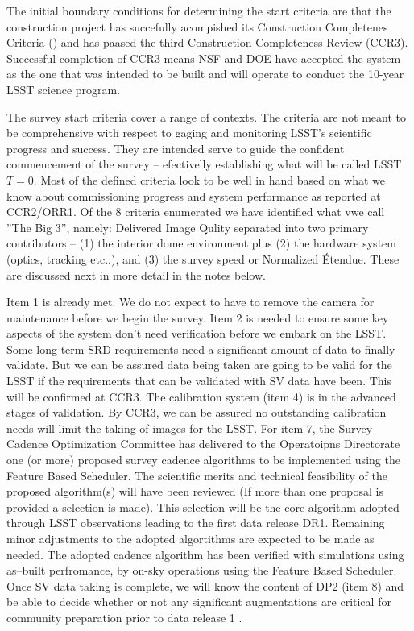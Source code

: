 The initial boundary conditions for determining the start criteria are that the construction project has succefully acompished its Construction Completenes Criteria (\cite{SITCOMTN-005}) and has paased the third Construction Completeness Review (CCR3).  Successful completion of CCR3 means NSF and DOE have accepted the system as the one that was intended to be built and will operate to conduct the 10-year LSST science program.  

The survey start criteria cover a range of contexts.  The criteria are not meant to be comprehensive with respect to gaging and monitoring LSST's scientific progress and success. They are intended serve to guide the confident commencement of the survey -- efectivelly establishing what will be called LSST $T=0$.  Most of the defined criteria look to be well in hand based on what we know about commissioning progress and system performance as reported at CCR2/ORR1.  Of the 8 criteria enumerated we have identified what vwe call ''The Big 3'', namely: Delivered Image Qulity separated into two primary contributors -- (1) the interior dome environment plus (2) the hardware system (optics, tracking etc..), and (3) the survey speed or Normalized \'{E}tendue. These are discussed next in more detail in the notes below.

Item 1 is already met. We do not expect to have to remove the camera for maintenance before we begin the survey. Item 2 is needed to ensure some key aspects of the system don't need verification before we embark on the LSST. Some long term SRD requirements need a significant amount of data to finally validate. But we can be assured data being taken are going to be valid for the LSST if the requirements that can be validated with SV data have been. This will be confirmed at CCR3. The calibration system (item 4)  is in the advanced stages of validation. By CCR3, we can be assured no outstanding calibration needs will limit the taking of images for the LSST. For item 7, the Survey Cadence Optimization Committee has delivered to the Operatoipns Directorate one (or more) proposed survey cadence algorithms to be implemented using the Feature Based Scheduler.  The scientific merits and technical feasibility of the proposed algorithm(s) will have been reviewed (If more than one proposal is provided a selection is made).  This selection will be the core algorithm adopted through LSST observations leading to the first data release DR1.  Remaining minor adjustments to the adopted algortithms are expected to be made as needed.  The adopted cadence algorithm has been verified with simulations using as--built perfromance, by on-sky operations using the Feature Based Scheduler.  Once SV data taking is complete, we will know the content of DP2 (item 8) and be able to decide whether or not any significant augmentations are critical for community preparation prior to data release 1 \citep[DR1; see][]{RTN-011}. 

